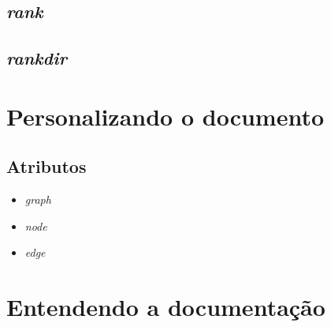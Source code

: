 \documentclass[a4paper,12pt]{article}
\begin{document}
    \subsection{\emph{rank}}

    \subsection{\emph{rankdir}}
    \break

  \section{Personalizando o documento}

    \subsection{Atributos}

      \begin{itemize}
        \item{\emph{graph}}

        \item{\emph{node}}

        \item{\emph{edge}}
      \end{itemize}

  \section{Entendendo a documentação}
\end{document}
